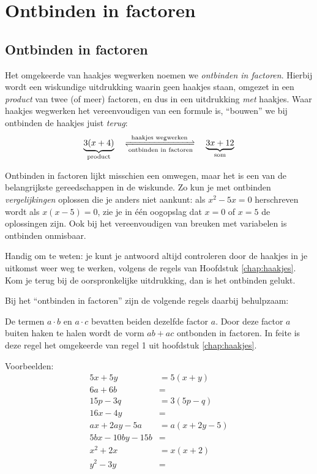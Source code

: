 \chapter{Ontbinden in factoren}
\label{chap:factoren}

\section{Ontbinden in factoren}
Het omgekeerde van haakjes wegwerken noemen we \emph{ontbinden in 
factoren}. Hierbij wordt een wiskundige uitdrukking waarin geen haakjes 
staan, omgezet in een \emph{product} van twee (of meer) factoren, en dus 
in een uitdrukking \emph{met} haakjes. Waar haakjes wegwerken het 
vereenvoudigen van een formule is, ``bouwen'' we bij ontbinden de haakjes 
juist \emph{terug}:
\[
\underbrace{3(x+4)}_{\text{product}} 
\quad 
\xrightleftharpoons[\text{ontbinden in factoren}]{\text{haakjes wegwerken}} 
\quad 
\underbrace{3x + 12}_{\text{som}}
\]

Ontbinden in factoren lijkt misschien een omwegen, maar het is een van de 
belangrijkste gereedschappen in de wiskunde. Zo kun je met ontbinden 
\emph{vergelijkingen} oplossen die je anders niet aankunt: als 
$x^2 - 5x = 0$ herschreven wordt als $x(x-5)=0$, zie je in \'e\'en oogopslag 
dat $x=0$ of $x=5$ de oplossingen zijn. Ook bij het vereenvoudigen van 
breuken met variabelen is ontbinden onmisbaar.

Handig om te weten: je kunt je antwoord altijd controleren door de haakjes 
in je uitkomst weer weg te werken, volgens de regels van Hoofdstuk \ref{chap:haakjes}. Kom je terug bij de oorspronkelijke 
uitdrukking, dan is het ontbinden gelukt.

Bij het ``ontbinden in factoren'' zijn de volgende regels daarbij behulpzaam:


De termen $a \cdot b$ en $a \cdot c$ bevatten beiden dezelfde factor $a$. Door deze factor $a$ buiten haken te halen wordt de vorm $ab+ac$ ontbonden in factoren.
In feite is deze regel het omgekeerde van regel 1 uit hoofdstuk \ref{chap:haakjes}.

Voorbeelden:
\begin{align*}
5x + 5y  &= 5(x + y) \\
6a + 6b  &= \\
15p - 3q &= 3(5p - q) \\
16x - 4y &= \\
ax + 2ay - 5a    &= a(x + 2y - 5) \\
5bx - 10by - 15b &= \\
x^2 + 2x &= x(x + 2) \\
y^2 - 3y &=
\end{align*}


